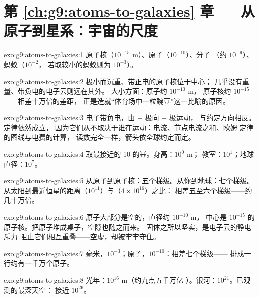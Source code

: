 \section*{第 \ref{ch:g9:atoms-to-galaxies} 章 --- 从原子到星系：宇宙的尺度}

\begin{solution}{exo:g9:atoms-to-galaxies:1}
原子核（$10^{-15}$ \unit{m}）、原子（$10^{-10}$）、分子
（约 $10^{-9}$）、蚂蚁（$10^{-2}$，
若取较小的蚂蚁则为 $10^{-3}$）。
\end{solution}

\begin{solution}{exo:g9:atoms-to-galaxies:2}
极小而沉重、带正电的原子核位于中心；
几乎没有重量、带负电的电子云则远在其外。
大小方面：原子约 $10^{-10}$ \unit{m}，
原子核约 $10^{-15}$ ——相差十万倍的差距，
正是造就“体育场中一粒豌豆”这一比喻的原因。
\end{solution}

\begin{solution}{exo:g9:atoms-to-galaxies:3}
电子带负电，由 $-$ 极向 $+$ 极运动，
与约定方向相反。定律依然成立，
因为它们从不取决于谁在运动：电流、节点电流之和、欧姆
定律的图线与电费的计算，
读数完全一样，箭头依全球约定而定。
\end{solution}

\begin{solution}{exo:g9:atoms-to-galaxies:4}
取最接近的 10 的幂。身高：$10^{0}$ \unit{m}；
教室：$10^{1}$；地球直径：$10^{7}$。
\end{solution}

\begin{solution}{exo:g9:atoms-to-galaxies:5}
从原子到原子核：五个梯级。从你到地球：七个梯级。
从太阳到最近恒星的距离（$10^{11}$）与（$4 \times 10^{16}$）之比：
相差五至六个梯级——约几十万倍。
\end{solution}

\begin{solution}{exo:g9:atoms-to-galaxies:6}
原子大部分是空的，直径约 $10^{-10}$ \unit{m}，
中心是 $10^{-15}$ 的原子核。把原子堆成桌子，空隙也随之而来。
固体之所以坚实，是电子云的静电斥力
阻止它们相互重叠——空虚，却被牢牢守住。
\end{solution}

\begin{solution}{exo:g9:atoms-to-galaxies:7}
毫米，$10^{-3}$；原子，$10^{-10}$：相差七个梯级——
排成一行约有一千万个原子。
\end{solution}

\begin{solution}{exo:g9:atoms-to-galaxies:8}
光年：$10^{16}$ \unit{m}（约九点五千万亿
）。银河：$10^{21}$。已观测的最深天空：
接近 $10^{26}$。
\end{solution}

